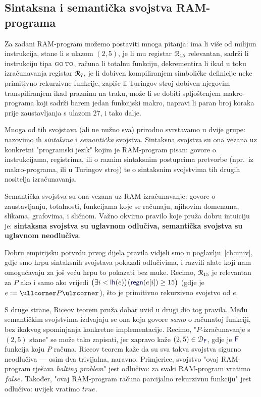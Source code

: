 \subsection{Sintaksna i semantička svojstva RAM-programa}

Za zadani RAM-program možemo postaviti mnoga pitanja: ima li više od milijun instrukcija, stane li s ulazom $(2,5)$, je li mu registar $\mathcal R_{15}$ relevantan, sadrži li instrukciju tipa $\textsc{go\,to}$, računa li totalnu funkciju, dekrementira li ikad u toku izračunavanja registar $\mathcal R_{7}$, je li dobiven kompiliranjem simboličke definicije neke primitivno rekurzivne funkcije, zapiše li Turingov stroj dobiven njegovim transpiliranjem ikad prazninu na traku, može li se dobiti spljoštenjem makro-programa koji sadrži barem jedan funkcijski makro, napravi li paran broj koraka prije zaustavljanja s ulazom $27$, i tako dalje.

Mnoga od tih svojstava (ali ne nužno sva) prirodno svrstavamo u dvije grupe: nazovimo ih \emph{sintaksna} i \emph{semantička} svojstva. Sintaksna svojstva su ona vezana uz konkretni "programski jezik" kojim je RAM-program pisan: govore o instrukcijama, registrima, ili o raznim sintaksnim postupcima pretvorbe (npr.\ iz makro-programa, ili u Turingov stroj) te o sintaksnim svojstvima tih drugih nositelja izračunavanja.

Semantička svojstva su ona vezana uz RAM-izračunavanje: govore o zaustavljanju, totalnosti, funkcijama koje se računaju, njihovim domenama, slikama, grafovima, i sličnom. Važno okvirno pravilo koje pruža dobru intuiciju je: \textbf{sintaksna svojstva su uglavnom odlučiva, semantička svojstva su uglavnom neodlučiva}.

Dobru empirijsku potvrdu prvog dijela pravila vidjeli smo u poglavlju~\ref{ch:univ}, gdje smo hrpu sintaksnih svojstava pokazali odlučivima, i razvili alate koji nam omogućavaju za još veću hrpu to pokazati bez muke. Recimo, $\mathcal R_{15}$ je relevantan za $P$ ako i samo ako vrijedi
$\bigl(\exists i<\f{lh}(e)\bigr)\bigl(\f{regn}(e[i])\ge15\bigr)$ (gdje je $e:=\kprog P$), što je primitivno rekurzivno svojstvo od $e$.

S druge strane, Riceov teorem pruža dobar uvid u drugi dio tog pravila. Među semantičkim svojstvima izdvajaju se ona koja govore \emph{samo} o računatoj funkciji, bez ikakvog spominjanja konkretne implementacije. Recimo, "$P$-izračunavanje s $(2,5)$ stane" se može tako zapisati, jer zapravo kaže $(2,5)\in\dom{\f F}$, gdje je $\f F$ funkcija koju $P$ računa. Riceov teorem kaže da su sva takva svojstva sigurno neodlučiva --- osim dva trivijalna, naravno. Primjerice, svojstvo "ovaj RAM-program rješava \emph{halting problem}" jest odlučivo: za svaki RAM-program vratimo $\mathit{false}$. Također, "ovaj RAM-program računa parcijalno rekurzivnu funkciju" jest odlučivo: uvijek vratimo $\mathit{true}$.

